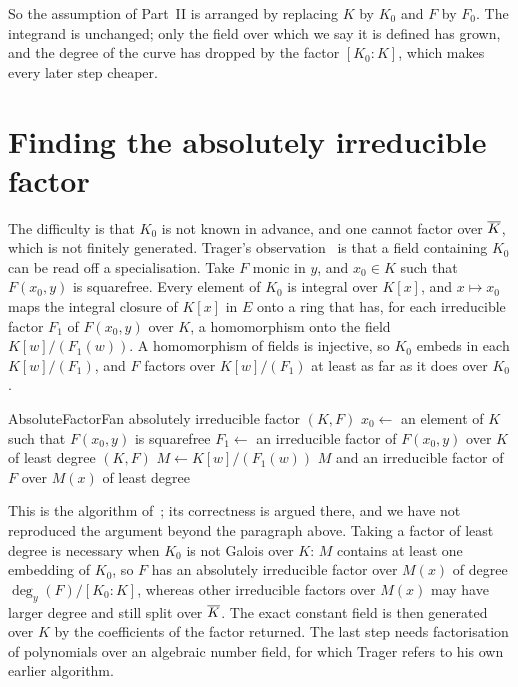 So the assumption of Part~II is arranged by replacing $K$ by $K_0$ and $F$ by
$F_0$. The integrand is unchanged; only the field over which we say it is
defined has grown, and the degree of the curve has dropped by the factor $[K_0
: K]$, which makes every later step cheaper.

\section{Finding the absolutely irreducible factor}\label{sec:const-algorithm}

The difficulty is that $K_0$ is not known in advance, and one cannot factor
over $\overline{K}$, which is not finitely generated. Trager's
observation~\cite[\S3.2]{trager1984} is that a field containing $K_0$ can be
read off a specialisation. Take $F$ monic in $y$, and $x_0 \in K$ such that
$F(x_0, y)$ is squarefree. Every element of $K_0$ is integral over $K[x]$,
and $x \mapsto x_0$ maps the integral closure of $K[x]$ in $E$ onto a ring
that has, for each irreducible factor $F_1$ of $F(x_0, y)$ over $K$, a
homomorphism onto the field $K[w]/(F_1(w))$. A homomorphism of fields is
injective, so $K_0$ embeds in each $K[w]/(F_1)$, and $F$ factors over
$K[w]/(F_1)$ at least as far as it does over $K_0$.

\begin{algo}{AbsoluteFactor}{F}{an absolutely irreducible factor}
 \Return $(K, F)$ \EndIf
\State $x_0 \gets$ an element of $K$ such that $F(x_0, y)$ is squarefree
\State $F_1 \gets$ an irreducible factor of $F(x_0, y)$ over $K$ of least degree
 \Return $(K, F)$ \EndIf
\State $M \gets K[w]/(F_1(w))$
\State \Return $M$ and an irreducible factor of $F$ over $M(x)$ of least degree
\end{algo}

This is the algorithm of~\cite[\S3.2]{trager1984}; its correctness is argued
there, and we have not reproduced the argument beyond the paragraph above.
Taking a factor of least degree is necessary when $K_0$ is not Galois over
$K$: $M$ contains at least one embedding of $K_0$, so $F$ has an absolutely
irreducible factor over $M(x)$ of degree $\deg_y(F)/[K_0 : K]$, whereas other
irreducible factors over $M(x)$ may have larger degree and still split over
$\overline{K}$.
The exact constant field is then generated over $K$ by the coefficients of
the factor returned. The last step needs factorisation of polynomials over an
algebraic number field, for which Trager refers to his own earlier algorithm.

